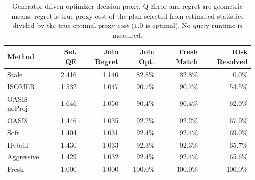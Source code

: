 \begin{table}[t]
  \centering
  \small
  \caption{Generator-driven optimizer-decision proxy. Q-Error and regret are geometric means; regret is true proxy cost of the plan selected from estimated statistics divided by the true optimal proxy cost ($1.0$ is optimal). No query runtime is measured.}
  \label{tab:optimizer_decision_proxy}
  \setlength{\tabcolsep}{4pt}
  \begin{tabular}{lrrrrr}
    \toprule
    Method & Sel. QE & Join Regret & Join Opt. & Fresh Match & Risk Resolved \\
    \midrule
    Stale & 2.416 & 1.140 & 82.8\% & 82.8\% & 0.0\% \\
    ISOMER & 1.532 & 1.047 & 90.7\% & 90.7\% & 54.5\% \\
    OASIS-noProj & 1.646 & 1.050 & 90.4\% & 90.4\% & 62.0\% \\
    OASIS & 1.446 & 1.035 & 92.2\% & 92.2\% & 67.9\% \\
    Soft & 1.404 & 1.031 & 92.4\% & 92.4\% & 69.0\% \\
    Hybrid & 1.430 & 1.033 & 92.3\% & 92.3\% & 65.7\% \\
    Aggressive & 1.429 & 1.032 & 92.4\% & 92.4\% & 65.6\% \\
    Fresh & 1.000 & 1.000 & 100.0\% & 100.0\% & 100.0\% \\
    \bottomrule
  \end{tabular}
\end{table}
